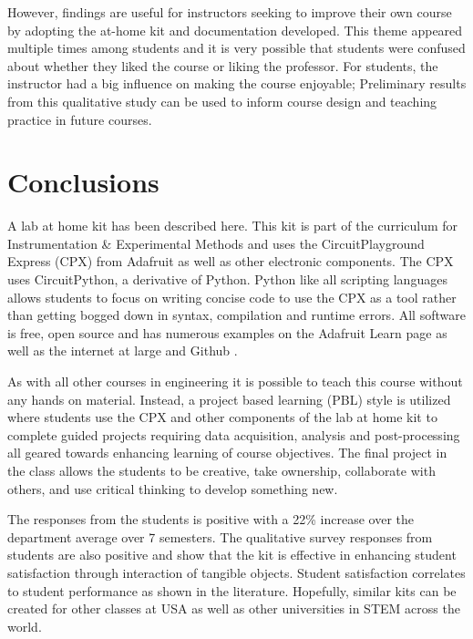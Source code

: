 However, findings are useful for instructors seeking to improve their
own course by adopting the at-home kit and documentation
developed. This theme appeared multiple times among students and it is
very possible that students were confused about whether they liked the
course or liking the professor. For students, the instructor had a big
influence on making the course enjoyable; Preliminary results from
this qualitative study can be used to inform course design and
teaching practice in future courses. 

\section{Conclusions}
A lab at home kit has been described here. This kit is part of the
curriculum for Instrumentation \& Experimental Methods and uses the
CircuitPlayground Express (CPX) from Adafruit as well as other
electronic components. The CPX uses CircuitPython, a derivative of
Python. Python like all scripting languages allows students to focus
on writing concise code to use the CPX as a tool rather than getting
bogged down in syntax, compilation and runtime errors. All software is
free, open source and has numerous examples on the Adafruit Learn page
as well as the internet at large and Github \cite{Github}. 

As with all other courses in engineering it is possible to teach this
course without any hands on material. Instead, a project based
learning (PBL) style is utilized where students use the CPX and other
components of the lab at home kit to complete guided projects
requiring data acquisition, analysis and post-processing all geared
towards enhancing learning of course objectives. The final project in
the class allows the students to be creative, take ownership,
collaborate with others, and use critical thinking to develop
something new.  

The responses from the students is positive with a 22\% increase over
the department average over 7 semesters. The qualitative survey
responses from students are also positive and show that the kit is
effective in enhancing student satisfaction through interaction of
tangible objects. Student satisfaction correlates to student
performance as shown in the literature. Hopefully, similar kits can be
created for other classes at USA as well as other universities in STEM
across the world.  
